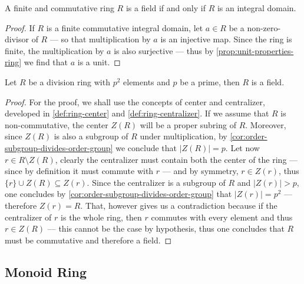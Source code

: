%
\begin{proposition}
\label{prop:commutative-field-iff-integral-domain}
A finite and commutative ring \(R\) is a field if and only if \(R\) is an
integral domain.
\end{proposition}
%

%
\begin{proof}
If \(R\) is a finite commutative integral domain, let \(a \in R\) be a
non-zero-divisor of \(R\) --- so that multiplication by \(a\) is an injective
map. Since the ring is finite, the multiplication by \(a\) is also surjective
--- thus by \cref{prop:unit-properties-ring} we find that \(a\) is a unit.
\end{proof}
%

%
\begin{proposition}
\label{prop:division-ring-p2-elements-commutative}
Let \(R\) be a division ring with \(p^2\) elements and \(p\) be a prime,
then \(R\) is a field.
\end{proposition}
%

%
\begin{proof}
For the proof, we shall use the concepts of center and centralizer, developed in
\cref{def:ring-center} and \cref{def:ring-centralizer}. If we assume that \(R\)
is non-commutative, the center \(Z(R)\) will be a proper subring of
\(R\). Moreover, since \(Z(R)\) is also a subgroup of \(R\) under
multiplication, by \cref{cor:order-subgroup-divides-order-group} we conclude
that \(|Z(R)| = p\). Let now \(r \in R \setminus Z(R)\), clearly the centralizer
must contain both the center of the ring --- since by definition it must commute
with \(r\) --- and by symmetry, \(r \in Z(r)\), thus
\(\{r\} \cup Z(R) \subseteq Z(r)\). Since the centralizer is a subgroup of \(R\)
and \(|Z(r)| > p\), one concludes by
\cref{cor:order-subgroup-divides-order-group} that \(|Z(r)| = p^2\) ---
therefore \(Z(r) = R\). That, however gives us a contradiction because if the
centralizer of \(r\) is the whole ring, then \(r\) commutes with every element
and thus \(r \in Z(R)\) --- this cannot be the case by hypothesis, thus one
concludes that \(R\) must be commutative and therefore a field.
\end{proof}
%

\subsection{Monoid Ring}

